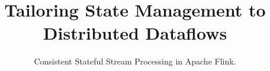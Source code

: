 \documentclass{vldb}
\begin{document}

\title{Tailoring State Management to Distributed Dataflows}


\subtitle{Consistent Stateful Stream Processing in Apache Flink\textsuperscript{\textregistered}.}


%
%
%
%


\end{document}
